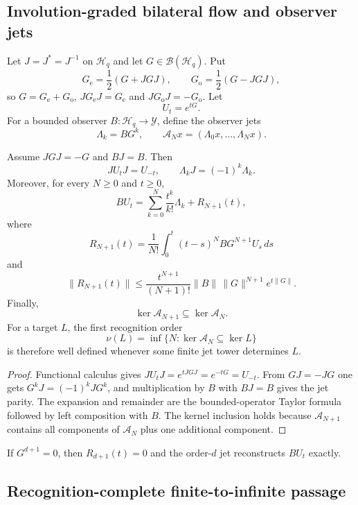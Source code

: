 \subsection{Involution-graded bilateral flow and observer jets}

Let $J=J^*=J^{-1}$ on $\mathcal H_q$ and let $G\in\mathcal B(\mathcal H_q)$. Put
\[
G_{\mathrm e}=\frac12(G+JGJ),\qquad
G_{\mathrm o}=\frac12(G-JGJ),
\]
so $G=G_{\mathrm e}+G_{\mathrm o}$, $JG_{\mathrm e}J=G_{\mathrm e}$ and $JG_{\mathrm o}J=-G_{\mathrm o}$. Let
\[
U_t=e^{tG}.
\]
For a bounded observer $B:\mathcal H_q\to\mathcal Y$, define the observer jets
\[
\Lambda_k=BG^k,
\qquad
\mathcal A_Nx=(\Lambda_0x,\ldots,\Lambda_Nx).
\]

\begin{theorem}
Assume $JGJ=-G$ and $BJ=B$. Then
\[
JU_tJ=U_{-t},
\qquad
\Lambda_kJ=(-1)^k\Lambda_k.
\]
Moreover, for every $N\ge0$ and $t\ge0$,
\[
BU_t=
\sum_{k=0}^{N}\frac{t^k}{k!}\Lambda_k+R_{N+1}(t),
\]
where
\[
R_{N+1}(t)=\frac1{N!}\int_0^t(t-s)^NBG^{N+1}U_s\,ds
\]
and
\[
\|R_{N+1}(t)\|
\le
\frac{t^{N+1}}{(N+1)!}\|B\|\,\|G\|^{N+1}e^{t\|G\|}.
\]
Finally,
\[
\ker\mathcal A_{N+1}\subseteq\ker\mathcal A_N.
\]
For a target $L$, the first recognition order
\[
\nu(L)=\inf\{N:\ker\mathcal A_N\subseteq\ker L\}
\]
is therefore well defined whenever some finite jet tower determines $L$.
\end{theorem}

\begin{proof}
Functional calculus gives $JU_tJ=e^{tJGJ}=e^{-tG}=U_{-t}$. From $GJ=-JG$ one gets $G^kJ=(-1)^kJG^k$, and multiplication by $B$ with $BJ=B$ gives the jet parity. The expansion and remainder are the bounded-operator Taylor formula followed by left composition with $B$. The kernel inclusion holds because $\mathcal A_{N+1}$ contains all components of $\mathcal A_N$ plus one additional component.
\end{proof}

\begin{corollary}
If $G^{d+1}=0$, then $R_{d+1}(t)=0$ and the order-$d$ jet reconstructs $BU_t$ exactly.
\end{corollary}

\subsection{Recognition-complete finite-to-infinite passage}

